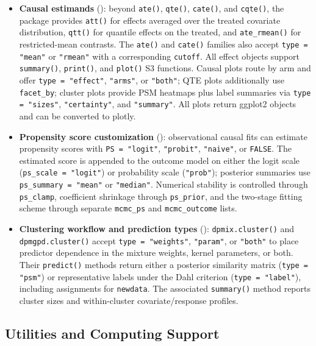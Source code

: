 \documentclass[article]{jss}\usepackage[]{graphicx}\usepackage[]{xcolor}
\DeclareRobustCommand{\pkg}[1]{\textsf{#1}}
\DeclareRobustCommand{\code}[1]{\nolinkurl{#1}}
\begin{document}
\begin{itemize}
\item \textbf{Causal estimands} (\label{subsec:app-causal-estimands}): beyond \code{ate()}, \code{qte()}, \code{cate()}, and \code{cqte()}, the package provides \code{att()} for effects averaged over the treated covariate distribution, \code{qtt()} for quantile effects on the treated, and \code{ate\_rmean()} for restricted-mean contrasts. The \code{ate()} and \code{cate()} families also accept \code{type = "mean"} or \code{"rmean"} with a corresponding \code{cutoff}. All effect objects support \code{summary()}, \code{print()}, and \code{plot()} S3 functions. Causal plots route by arm and offer \code{type = "effect"}, \code{"arms"}, or \code{"both"}; QTE plots additionally use \code{facet\_by}; cluster plots provide PSM heatmaps plus label summaries via \code{type = "sizes"}, \code{"certainty"}, and \code{"summary"}. All plots return \pkg{ggplot2} objects and can be converted to \pkg{plotly}.


\item \textbf{Propensity score customization} (\label{subsec:app-ps}): observational causal fits can estimate propensity scores with \code{PS = "logit"}, \code{"probit"}, \code{"naive"}, or \code{FALSE}. The estimated score is appended to the outcome model on either the logit scale (\code{ps\_scale = "logit"}) or probability scale (\code{"prob"}); posterior summaries use \code{ps\_summary = "mean"} or \code{"median"}. Numerical stability is controlled through \code{ps\_clamp}, coefficient shrinkage through \code{ps\_prior}, and the two-stage fitting scheme through separate \code{mcmc\_ps} and \code{mcmc\_outcome} lists.
\item \textbf{Clustering workflow and prediction types} (\label{subsec:app-clustering-details}): \code{dpmix.cluster()} and \code{dpmgpd.cluster()} accept \code{type = "weights"}, \code{"param"}, or \code{"both"} to place predictor dependence in the mixture weights, kernel parameters, or both. Their \code{predict()} methods return either a posterior similarity matrix (\code{type = "psm"}) or representative labels under the Dahl criterion (\code{type = "label"}), including assignments for \code{newdata}. The associated \code{summary()} method reports cluster sizes and within-cluster covariate/response profiles.

\end{itemize}

\subsection{Utilities and Computing Support}
\label{subsec:app-utilities}
\end{document}
